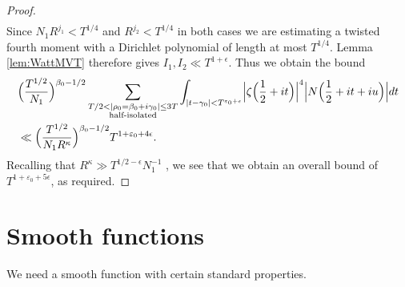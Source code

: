 \documentclass[12pt]{amsart}
\theoremstyle{plain}
\theoremstyle{definition}
\theoremstyle{remark}
\begin{document}
\begin{proof}
\begin{align*}
\end{align*}
Since $N_1 R^{j_1}<T^{1/4}$ and $R^{j_2}<T^{1/4}$ in both cases we are estimating a twisted fourth moment with a Dirichlet polynomial of length at most $T^{1/4}$. Lemma \ref{lem:WattMVT} therefore gives $I_1,I_2\ll T^{1+\epsilon}$. Thus we obtain the bound
\begin{align*}
&\Bigl(\frac{T^{1/2}}{N_1}\Bigr)^{\beta_0-1/2}\sum_{\substack{T/2<|\rho_0=\beta_0+i\gamma_0|\leq 3T\\ \text{half-isolated} }}\int_{|t-\gamma_0|<T^{\varepsilon_0 + \epsilon}} \Bigl| \zeta \Bigl(\frac{1}{2}+it \Bigr) \Bigr|^{4}\Bigl|N\Bigl(\frac{1}{2}+it+iu\Bigr)\Bigr| dt \\
&\ll  \Bigl(\frac{T^{1/2}}{N_1 R^{\kappa}}\Bigr)^{\beta_0-1/2} T^{1+\varepsilon_0+4\epsilon}.
\end{align*}
Recalling that $R^{\kappa}\gg T^{1/2-\epsilon}N_1^{-1}$ , we see that we obtain an overall bound of $T^{1+\varepsilon_0+5\epsilon}$, as required.
\end{proof}
%
%
%
%


\section{Smooth functions}

We need a smooth function with certain standard properties.
\end{document}

